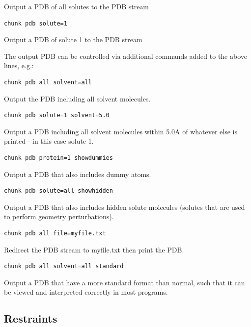 \documentclass[letterpaper,10pt,english]{manual}
\begin{document}
Output a PDB of all solutes to the PDB stream

\begin{Verbatim}[commandchars=@\[\]]
chunk pdb solute=1
\end{Verbatim}

Output a PDB of solute 1 to the PDB stream

The output PDB can be controlled via additional commands added to the above lines, e.g.:

\begin{Verbatim}[commandchars=@\[\]]
chunk pdb all solvent=all
\end{Verbatim}

Output the PDB including all solvent molecules.

\begin{Verbatim}[commandchars=@\[\]]
chunk pdb solute=1 solvent=5.0
\end{Verbatim}

Output a PDB including all solvent molecules within 5.0A of whatever else is printed - in this case solute 1.

\begin{Verbatim}[commandchars=@\[\]]
chunk pdb protein=1 showdummies
\end{Verbatim}

Output a PDB that also includes dummy atoms.

\begin{Verbatim}[commandchars=@\[\]]
chunk pdb solute=all showhidden
\end{Verbatim}

Output a PDB that also includes hidden solute molecules (solutes that are used to perform geometry perturbations).

\begin{Verbatim}[commandchars=@\[\]]
chunk pdb all file=myfile.txt
\end{Verbatim}

Redirect the PDB stream to myfile.txt then print the PDB.

\begin{Verbatim}[commandchars=@\[\]]
chunk pdb all solvent=all standard
\end{Verbatim}

Output a PDB that have a more standard format than normal, such that it can be viewed and interpreted correctly in most programs.

\subsection{Restraints}
\end{document}
